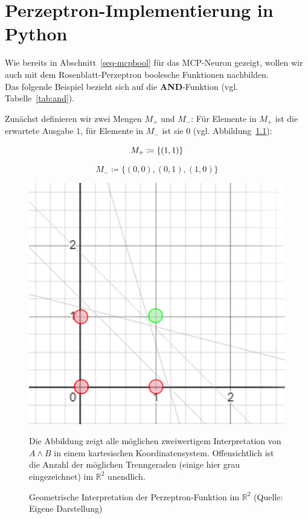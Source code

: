 \chapter{Perzeptron-Implementierung in Python}\label{appendix:pythonperzeptron}

Wie bereits in Abschnitt~\ref{seq-mcpbool} für das MCP-Neuron gezeigt, wollen wir auch mit dem Rosenblatt-Perzeptron boolesche Funktionen nachbilden.\\

Das folgende Beispiel bezieht sich auf die \textbf{AND}-Funktion (vgl. Tabelle~\ref{tab:and}).

Zunächst definieren wir zwei Mengen $M_+$ und $M_-$: Für Elemente in $M_+$ ist die erwartete Ausgabe $1$, für Elemente in $M_-$ ist sie $0$ (vgl. Abbildung~\ref{fig-rpand}):

\begin{equation}
    M_+ \coloneqq \{(1, 1)\}\\
\end{equation}

\begin{equation}
    M_- \coloneqq \{(0, 0), (0,1), (1,0)\}
\end{equation}

\begin{figure}[h]
    \begin{center}
    \includegraphics{chapters/Anhang/images/perceptron-and}
    \caption{Geometrische Interpretation der Perzeptron-Funktion im $\mathbb{R}^2$ (Quelle: Eigene Darstellung)}
    \end{center}
    \label{fig-rpand}
    \small {
    Die Abbildung zeigt alle möglichen zweiwertigem Interpretation von $A \land B$ in einem kartesischen Koordinatensystem.
    Offensichtlich ist die Anzahl der möglichen Trenngeraden (einige hier grau eingezeichnet) im $\mathbb{R}^2$ unendlich.
    }
\end{figure}

